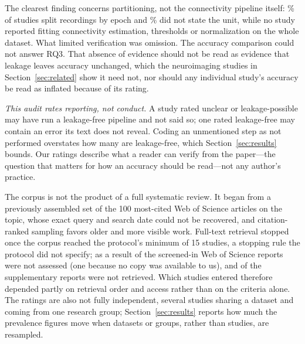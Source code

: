
The clearest finding concerns partitioning, not the connectivity pipeline itself: \PctEpoch\% of studies split recordings by epoch and \PctUnclearSplit\% did not state the unit, while no study reported fitting connectivity estimation, thresholds or normalization on the whole dataset. What limited verification was omission. The accuracy comparison could not answer RQ3. That absence of evidence should not be read as evidence that leakage leaves accuracy unchanged, which the neuroimaging studies in Section~\ref{sec:related} show it need not, nor should any individual study's accuracy be read as inflated because of its rating.


\emph{This audit rates reporting, not conduct.} A study rated unclear or leakage-possible may have run a leakage-free pipeline and not said so; one rated leakage-free may contain an error its text does not reveal. Coding an unmentioned step as not performed overstates how many are leakage-free, which Section~\ref{sec:results} bounds. Our ratings describe what a reader can verify from the paper---the question that matters for how an accuracy should be read---not any author's practice.

The corpus is not the product of a full systematic review. It began from a previously assembled set of the 100 most-cited Web of Science articles on the topic, whose exact query and search date could not be recovered, and citation-ranked sampling favors older and more visible work. Full-text retrieval stopped once the corpus reached the protocol's minimum of 15 studies, a stopping rule the protocol did not specify; as a result \NwosNotRetrieved{} of the \NwosSought{} screened-in Web of Science reports were not assessed (one because no copy was available to us), and \NsuppNotRetrieved{} of the \NsuppSought{} supplementary reports were not retrieved. Which studies entered therefore depended partly on retrieval order and access rather than on the criteria alone. The ratings are also not fully independent, several studies sharing a dataset and \NgroupStudies{} coming from one research group; Section~\ref{sec:results} reports how much the prevalence figures move when datasets or groups, rather than studies, are resampled.

